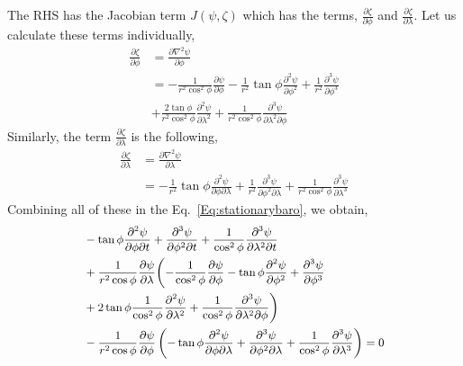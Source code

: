 \documentclass[aps,pra,a4paper,twocolumn,longbibliography,groupedaddress]{revtex4-2}
\begin{document}
The RHS has the Jacobian term $J(\psi, \zeta)$ which has the terms, $\frac{\partial \zeta}{\partial \phi}$ and $\frac{\partial \zeta}{\partial \lambda}$. Let us calculate these terms individually,
\begin{equation}
\begin{split}
       \frac{\partial \zeta}{\partial \phi} &= \frac{\partial \nabla^2 \psi}{\partial \phi} \\
       &= -\frac{1}{r^2 \cos^2\phi} \frac{\partial \psi}{\partial \phi} - \frac{1}{r^2}\tan\phi\frac{\partial^2 \psi}{\partial \phi^2} + \frac{1}{r^2}\frac{\partial^3 \psi}{\partial \phi^3} \\ &+ \frac{2\tan\phi}{r^2 \cos^2\phi}\frac{\partial^2 \psi}{\partial \lambda^2}  + \frac{1}{r^2\cos^2\phi}\frac{\partial^3 \psi}{\partial \lambda^2 \partial \phi} 
\end{split}
\end{equation}
Similarly, the term $\frac{\partial \zeta}{\partial \lambda}$ is the following,
\begin{equation}
    \begin{split}
         \frac{\partial \zeta}{\partial \lambda} &= \frac{\partial \nabla^2 \psi}{\partial \lambda} \\
         &= -\frac{1}{r^2}\tan\phi\frac{\partial^2 \psi}{\partial \phi \partial \lambda} + \frac{1}{r^2}\frac{\partial^3 \psi}{\partial \phi^2 \partial \lambda} + \frac{1}{r^2\cos^2\phi}\frac{\partial^3 \psi}{\partial \lambda^3} 
    \end{split}
\end{equation}
Combining all of these in the Eq.~\eqref{Eq:stationarybaro}, we obtain,
\begin{equation}
\small
    \begin{split}
      &  -\tan\phi\frac{\partial^2 \psi}{\partial \phi \partial t} + \frac{\partial^3 \psi}{\partial \phi^2 \partial t} + \frac{1}{\cos^2\phi}\frac{\partial^3 \psi}{\partial \lambda^2 \partial t}  \\
      &+ \frac{1}{r^2 \cos\phi}\frac{\partial \psi}{\partial \lambda}\biggl( -\frac{1}{\cos^2\phi} \frac{\partial \psi}{\partial \phi} - \tan\phi\frac{\partial^2 \psi}{\partial \phi^2} + \frac{\partial^3 \psi}{\partial \phi^3} \\ &+ 2\tan\phi\frac{1}{\cos^2\phi}\frac{\partial^2 \psi}{\partial \lambda^2}  + \frac{1}{\cos^2\phi}\frac{\partial^3 \psi}{\partial \lambda^2 \partial \phi}\biggr) \\
      & - \frac{1}{r^2 \cos\phi}\frac{\partial \psi}{\partial \phi}\left(-\tan\phi\frac{\partial^2 \psi}{\partial \phi \partial \lambda} + \frac{\partial^3 \psi}{\partial \phi^2 \partial \lambda} + \frac{1}{\cos^2\phi}\frac{\partial^3 \psi}{\partial \lambda^3} \right) = 0
    \end{split}
\label{Eq:stationarybarostreamline}
\end{equation}
\end{document}
